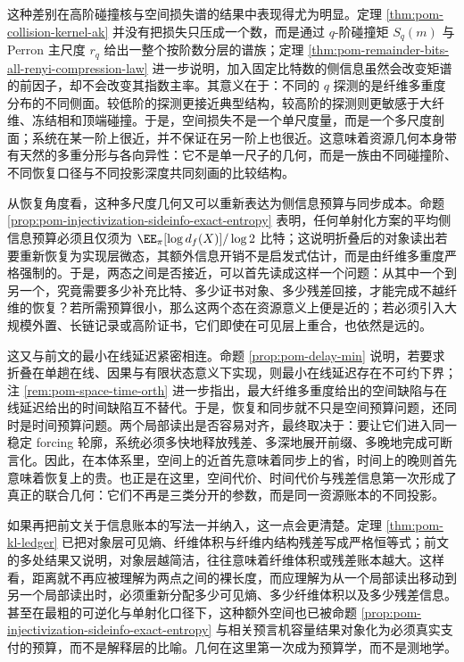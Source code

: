 这种差别在高阶碰撞核与空间损失谱的结果中表现得尤为明显。定理 \ref{thm:pom-collision-kernel-ak} 并没有把损失只压成一个数，而是通过 \(q\)-阶碰撞矩 \(S_q(m)\) 与 Perron 主尺度 \(r_q\) 给出一整个按阶数分层的谱族；定理 \ref{thm:pom-remainder-bits-all-renyi-compression-law} 进一步说明，加入固定比特数的侧信息虽然会改变矩谱的前因子，却不会改变其指数主率。其意义在于：不同的 \(q\) 探测的是纤维多重度分布的不同侧面。较低阶的探测更接近典型结构，较高阶的探测则更敏感于大纤维、冻结相和顶端碰撞。于是，空间损失不是一个单尺度量，而是一个多尺度剖面；系统在某一阶上很近，并不保证在另一阶上也很近。这意味着资源几何本身带有天然的多重分形与各向异性：它不是单一尺子的几何，而是一族由不同碰撞阶、不同恢复口径与不同投影深度共同刻画的比较结构。

从恢复角度看，这种多尺度几何又可以重新表达为侧信息预算与同步成本。命题 \ref{prop:pom-injectivization-sideinfo-exact-entropy} 表明，任何单射化方案的平均侧信息预算必须且仅须为 \(\EE_{\pi}[\log d_f(X)]/\log 2\) 比特；这说明折叠后的对象读出若要重新恢复为实现层微态，其额外信息开销不是启发式估计，而是由纤维多重度严格强制的。于是，两态之间是否接近，可以首先读成这样一个问题：从其中一个到另一个，究竟需要多少补充比特、多少证书对象、多少残差回接，才能完成不越纤维的恢复？若所需预算很小，那么这两个态在资源意义上便是近的；若必须引入大规模外置、长链记录或高阶证书，它们即使在可见层上重合，也依然是远的。

这又与前文的最小在线延迟紧密相连。命题 \ref{prop:pom-delay-min} 说明，若要求折叠在单趟在线、因果与有限状态意义下实现，则最小在线延迟存在不可约下界；注 \ref{rem:pom-space-time-orth} 进一步指出，最大纤维多重度给出的空间缺陷与在线延迟给出的时间缺陷互不替代。于是，恢复和同步就不只是空间预算问题，还同时是时间预算问题。两个局部读出是否容易对齐，最终取决于：要让它们进入同一稳定 forcing 轮廓，系统必须多快地释放残差、多深地展开前缀、多晚地完成可断言化。因此，在本体系里，空间上的近首先意味着同步上的省，时间上的晚则首先意味着恢复上的贵。也正是在这里，空间代价、时间代价与残差信息第一次形成了真正的联合几何：它们不再是三类分开的参数，而是同一资源账本的不同投影。

如果再把前文关于信息账本的写法一并纳入，这一点会更清楚。定理 \ref{thm:pom-kl-ledger} 已把对象层可见熵、纤维体积与纤维内结构残差写成严格恒等式；前文的多处结果又说明，对象层越简洁，往往意味着纤维体积或残差账本越大。这样看，距离就不再应被理解为两点之间的裸长度，而应理解为从一个局部读出移动到另一个局部读出时，必须重新分配多少可见熵、多少纤维体积以及多少残差信息。甚至在最粗的可逆化与单射化口径下，这种额外空间也已被命题 \ref{prop:pom-injectivization-sideinfo-exact-entropy} 与相关预言机容量结果对象化为必须真实支付的预算，而不是解释层的比喻。几何在这里第一次成为预算学，而不是测地学。

